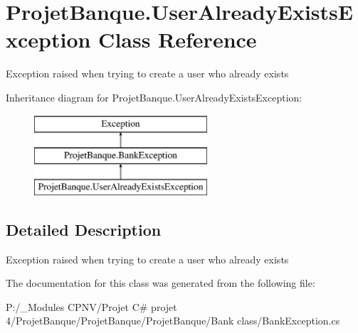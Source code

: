 \hypertarget{class_projet_banque_1_1_user_already_exists_exception}{}\section{Projet\+Banque.\+User\+Already\+Exists\+Exception Class Reference}
\label{class_projet_banque_1_1_user_already_exists_exception}


Exception raised when trying to create a user who already exists  


Inheritance diagram for Projet\+Banque.\+User\+Already\+Exists\+Exception\+:\begin{figure}[H]
\begin{center}
\leavevmode
\includegraphics[height=3.000000cm]{class_projet_banque_1_1_user_already_exists_exception}
\end{center}
\end{figure}


\subsection{Detailed Description}
Exception raised when trying to create a user who already exists 



The documentation for this class was generated from the following file\+:\begin{DoxyCompactItemize}
\item 
P\+:/\+\_\+\+Modules C\+P\+N\+V/\+Projet C\# projet 4/\+Projet\+Banque/\+Projet\+Banque/\+Projet\+Banque/\+Bank class/Bank\+Exception.\+cs\end{DoxyCompactItemize}
